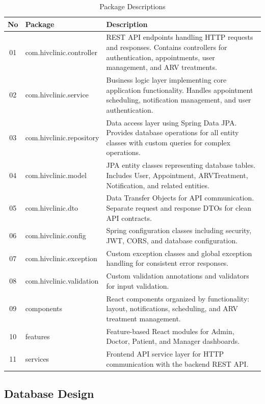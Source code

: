 \documentclass[12pt,a4paper]{article}
\begin{document}
\begin{table}[H]
\centering
\caption{Package Descriptions}
\label{tab:package-descriptions}
\begin{tabularx}{\textwidth}{|c|l|X|}
\hline
\textbf{No} & \textbf{Package} & \textbf{Description} \\
\hline
01 & com.hivclinic.controller & REST API endpoints handling HTTP requests and responses. Contains controllers for authentication, appointments, user management, and ARV treatments. \\
\hline
02 & com.hivclinic.service & Business logic layer implementing core application functionality. Handles appointment scheduling, notification management, and user authentication. \\
\hline
03 & com.hivclinic.repository & Data access layer using Spring Data JPA. Provides database operations for all entity classes with custom queries for complex operations. \\
\hline
04 & com.hivclinic.model & JPA entity classes representing database tables. Includes User, Appointment, ARVTreatment, Notification, and related entities. \\
\hline
05 & com.hivclinic.dto & Data Transfer Objects for API communication. Separate request and response DTOs for clean API contracts. \\
\hline
06 & com.hivclinic.config & Spring configuration classes including security, JWT, CORS, and database configuration. \\
\hline
07 & com.hivclinic.exception & Custom exception classes and global exception handling for consistent error responses. \\
\hline
08 & com.hivclinic.validation & Custom validation annotations and validators for input validation. \\
\hline
09 & components & React components organized by functionality: layout, notifications, scheduling, and ARV treatment management. \\
\hline
10 & features & Feature-based React modules for Admin, Doctor, Patient, and Manager dashboards. \\
\hline
11 & services & Frontend API service layer for HTTP communication with the backend REST API. \\
\hline
\end{tabularx}
\end{table}

\subsection{Database Design}
\end{document}
